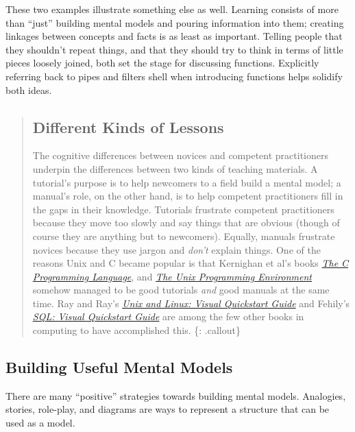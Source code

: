 These two examples illustrate something else as well. Learning consists
of more than ``just'' building mental models and pouring information
into them; creating linkages between concepts and facts is as least as
important. Telling people that they shouldn't repeat things, and that
they should try to think in terms of little pieces loosely joined, both
set the stage for discussing functions. Explicitly referring back to
pipes and filters shell when introducing functions helps solidify both
ideas.

\begin{quote}
\subsection{Different Kinds of
Lessons}\label{different-kinds-of-lessons}

The cognitive differences between novices and competent practitioners
underpin the differences between two kinds of teaching materials. A
tutorial's purpose is to help newcomers to a field build a mental model;
a manual's role, on the other hand, is to help competent practitioners
fill in the gaps in their knowledge. Tutorials frustrate competent
practitioners because they move too slowly and say things that are
obvious (though of course they are anything but to newcomers). Equally,
manuals frustrate novices because they use jargon and \emph{don't}
explain things. One of the reasons Unix and C became popular is that
Kernighan et al's books
\emph{\href{http://www.amazon.com/Programming-Language-Brian-W-Kernighan/dp/0131103628/}{The
C Programming Language}}, and
\emph{\href{http://www.amazon.com/Unix-Programming-Environment-Prentice-Hall-Software/dp/013937681X/}{The
Unix Programming Environment}} somehow managed to be good tutorials
\emph{and} good manuals at the same time. Ray and Ray's
\emph{\href{http://www.amazon.com/Unix-Linux-Visual-QuickStart-Guide/dp/0321997549/}{Unix
and Linux: Visual Quickstart Guide}} and Fehily's
\emph{\href{http://www.amazon.com/SQL-Visual-QuickStart-Guide-3rd/dp/0321553578/}{SQL:
Visual Quickstart Guide}} are among the few other books in computing to
have accomplished this. \{: .callout\}
\end{quote}

\subsection{Building Useful Mental
Models}\label{building-useful-mental-models}

There are many ``positive'' strategies towards building mental models.
Analogies, stories, role-play, and diagrams are ways to represent a
structure that can be used as a model.

